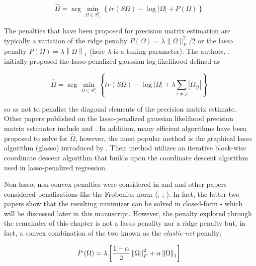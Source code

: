 \documentclass[11pt,]{report}
\theoremstyle{definition}
\theoremstyle{definition}
\theoremstyle{definition}
\theoremstyle{remark}
\begin{document}
\begin{equation}
\hat{\Omega} = \arg\min_{\Omega \in S_{+}^{p}}\left\{ tr\left(S\Omega\right) - \log\left|\Omega \right| + P\left( \Omega \right) \right\}
\label{eq:omegapen}
\end{equation}

The penalties that have been proposed for precision matrix estimation are typically a variation of the ridge penalty \(P\left(\Omega \right) = \lambda\|\Omega \|_{F}^{2}/2\) or the lasso penalty \(P\left(\Omega \right) = \lambda\left\|\Omega\right\|_{1}\) (here \(\lambda\) is a tuning parameter). The authors, \citet{yuan2007model}, initially proposed the lasso-penalized gaussian log-likelihood defined as

\begin{equation}
\hat{\Omega} = \arg\min_{\Omega \in S_{+}^{p}}\left\{ tr\left(S\Omega\right) - \log\left|\Omega \right| + \lambda\sum_{i \neq j}\left|\Omega_{ij}\right| \right\}
\label{eq:omegapenlasso}
\end{equation}

so as not to penalize the diagonal elements of the precision matrix estimate. Other papers published on the lasso-penalized gaussian likelihood precision matrix estimator include \citet{rothman2008sparse} and \citet{friedman2008sparse}. In addition, many efficient algorithms have been proposed to solve for \(\hat{\Omega}\), however, the most popular method is the graphical lasso algorithm (glasso) introduced by \citet{friedman2008sparse}. Their method utilizes an iterative block-wise coordinate descent algorithm that builds upon the coordinate descent algorithm used in lasso-penalized regression.

Non-lasso, non-convex penalties were considered in \citet{lam2009sparsistency} and \citet{fan2009network} and other papers considered penalizations like the Frobenius norm (\citet{rothman2014existence}; \citet{witten2009covariance}; \citet{price2015ridge}). In fact, the latter two papers show that the resulting minimizer can be solved in closed-form - which will be discussed later in this manuscript. However, the penalty explored through the remainder of this chapter is not a lasso penality nor a ridge penalty but, in fact, a convex combination of the two known as the \emph{elastic-net} penalty:

\begin{equation}
P\left( \Omega \right) = \lambda\left[\frac{1 - \alpha}{2}\left\| \Omega \right\|_{F}^{2} + \alpha\left\| \Omega \right\|_{1} \right]
\label{eq:penelastic}\notag
\end{equation}
\end{document}
